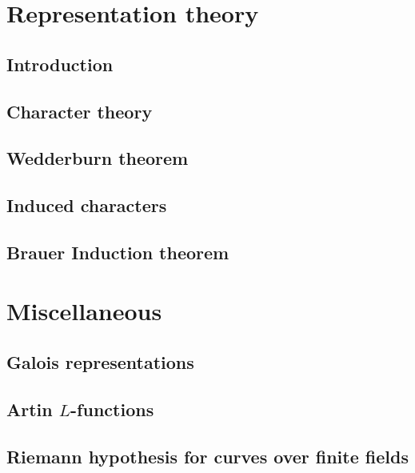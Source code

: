 \documentclass[oneside, 12pt, ]{scrbook}
\theoremstyle{theorem}
\begin{document}
\part{Representation theory}

\chapter{Introduction}

\chapter{Character theory}

\chapter{Wedderburn theorem}

\chapter{Induced characters}

\chapter{Brauer Induction theorem}



\part{Miscellaneous}

\chapter{Galois representations}

\chapter{Artin $L$-functions}

\chapter{Riemann hypothesis for curves over finite fields}
\end{document}

